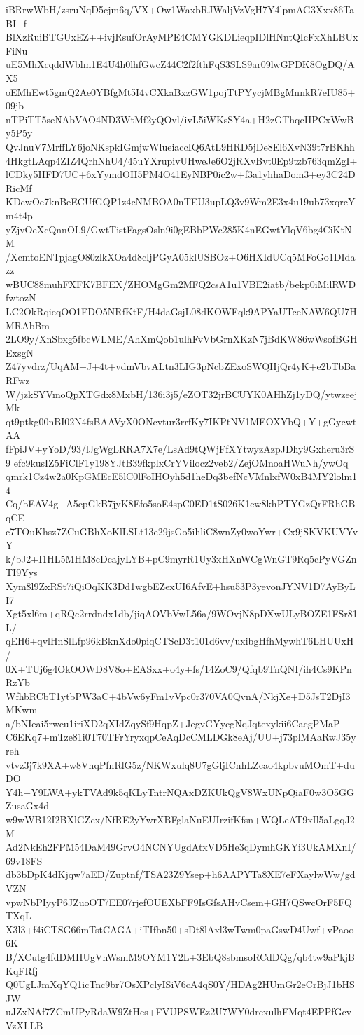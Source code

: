 iBRrwWbH/zsruNqD5cjm6q/VX+Ow1WaxbRJWaljVzVgH7Y4lpmAG3Xxx86TaBI+f
BlXzRuiBTGUxEZ++ivjRsufOrAyMPE4CMYGKDLieqpIDlHNntQIcFxXhLBUxFiNu
uE5MhXcqddWblm1E4U4h0lhfGwcZ44C2f2fthFqS3SLS9ar09lwGPDK8OgDQ/AX5
oEMhEwt5gmQ2Ae0YBfgMt5I4vCXkaBxzGW1pojTtPYycjMBgMnnkR7eIU85+09jb
nTPiTT5seNAbVAO4ND3WtMf2yQOvl/ivL5iWKsSY4a+H2zGThqcIIPCxWwBy5P5y
QvJnuV7MrffLY6joNKspkIGmjwWlueiaccIQ6AtL9HRD5jDe8El6XvN39t7rBKhh
4HkgtLAqp4ZIZ4QrhNhU4/45uYXrupivUHweJe6O2jRXvBvt0Ep9tzb763qmZgI+
lCDky5HFD7UC+6xYymdOH5PM4O41EyNBP0ic2w+f3a1yhhaDom3+ey3C24DRicMf
KDcwOe7knBeECUfGQP1z4cNMBOA0nTEU3upLQ3v9Wm2E3x4u19ub73xqrcYm4t4p
yZjvOeXcQnnOL9/GwtTistFagsOsln9i0gEBbPWc285K4nEGwtYlqV6bg4CiKtNM
/XcmtoENTpjagO80zlkXOa4d8cljPGyA05klUSBOz+O6HXIdUCq5MFoGo1DIdazz
wBUC88muhFXFK7BFEX/ZHOMgGm2MFQ2csA1u1VBE2iatb/bekp0iMilRWDfwtozN
LC2OkRqieqOO1FDO5NRfKtF/H4daGsjL08dKOWFqk9APYaUTceNAW6QU7HMRAbBm
2LO9y/XnSbxg5fbcWLME/AhXmQob1ulhFvVbGrnXKzN7jBdKW86wWsofBGHExsgN
Z47yvdrz/UqAM+J+4t+vdmVbvALtn3LIG3pNcbZExoSWQHjQr4yK+e2bTbBaRFwz
W/jzkSYVmoQpXTGdx8MxbH/136i3j5/eZOT32jrBCUYK0AHhZj1yDQ/ytwzeejMk
qt9ptkg00nBI02N4fsBAAVyX0ONcvtur3rrfKy7IKPtNV1MEOXYbQ+Y+gGycwtAA
fFpiJV+yYoD/93/lJgWgLRRA7X7e/LsAd9tQWjFfXYtwyzAzpJDhy9Gxheru3rS9
efc9kusIZ5FiClF1y198YJtB39fkplxCrYVilocz2veb2/ZejOMnoaHWuNh/ywOq
qmrk1Cz4w2a0KpGMEcE5lC0lFoIHOyh5d1heDq3befNcVMnlxfW0xB4MY2lolm14
Cq/bEAV4g+A5cpGkB7jyK8Efo5soE4spC0ED1tS026K1ew8khPTYGzQrFRhGBqCE
c7TOuKhsz7ZCuGBhXoKlLSLt13e29jsGo5ihliC8wnZy0woYwr+Cx9jSKVKUVYvY
k/bJ2+I1HL5MHM8cDcajyLYB+pC9myrR1Uy3xHXnWCgWnGT9Rq5cPyVGZnTI9Yys
Xym8l9ZxRSt7iQiOqKK3Dd1wgbEZexUI6AfvE+hsu53P3yevonJYNV1D7AyByLI7
Xgt5xl6m+qRQc2rrdndx1db/jiqAOVbVwL56a/9WOvjN8pDXwULyBOZE1FSr81L/
qEH6+qvlHnSlLfp96kBknXdo0piqCTScD3t101d6vv/uxibgHfhMywhT6LHUUxH/
0X+TUj6g4OkOOWD8V8o+EASxx+o4y+fs/14ZoC9/Qfqb9TnQNI/ih4Cs9KPnRzYb
WfhbRCbT1ytbPW3aC+4bVw6yFm1vVpc0r370VA0QvnA/NkjXe+D5JsT2DjI3MKwm
a/bNIeai5rwcu1iriXD2qXIdZqySf9HqpZ+JegvGYycgNqJqtexykii6CacgPMaP
C6EKq7+mTze81i0T70TFrYryxqpCeAqDcCMLDGk8eAj/UU+j73plMAaRwJ35yreh
vtvz3j7k9XA+w8VhqPfnRlG5z/NKWxulq8U7gGljICnhLZcao4kpbvuMOmT+duDO
Y4h+Y9LWA+ykTVAd9k5qKLyTntrNQAxDZKUkQgV8WxUNpQiaF0w3O5GGZusaGx4d
w9wWB12I2BXlGZcx/NfRE2yYwrXBFglaNuEUIrzifKfsn+WQLeAT9xIl5aLgqJ2M
Ad2NkEh2FPM54DaM49GrvO4NCNYUgdAtxVD5He3qDymhGKYi3UkAMXnI/69v18FS
db3bDpK4dKjqw7aED/Zuptnf/TSA23Z9Ysep+h6AAPYTa8XE7eFXaylwWw/gdVZN
vpwNbPIyyP6JZuoOT7EE07rjefOUEXbFF9IsGfsAHvCsem+GH7QSwcOrF5FQTXqL
X3l3+f4iCTSG66mTstCAGA+iTIfbn50+sDt8lAxl3wTwm0paGswD4Uwf+vPaoo6K
B/XCutg4fdDMHUgVhWsmM9OYM1Y2L+3EbQ8sbmsoRCdDQg/qb4tw9aPkjBKqFRfj
Q0UgLJmXqYQ1icTnc9br7OsXPclyISiV6cA4qS0Y/HDAg2HUmGr2eCrBjJ1bHSJW
uJZxNAf7ZCmUPyRdaW9ZtHes+FVUPSWEz2U7WY0drcxulhFMqt4EPPfGcvVzXLLB
